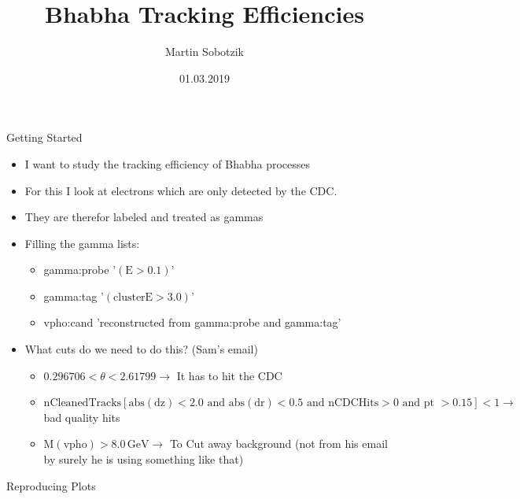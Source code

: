 \documentclass[10pt]{beamer}
\title{Bhabha Tracking Efficiencies}
\date{01.03.2019}
\author{Martin Sobotzik}
\institute{Johannes Gutenberg Universit\"at Mainz}
\begin{document}
\maketitle
{%



\begin{frame}{Getting Started}

\begin{itemize}	
	\item I want to study the tracking efficiency of Bhabha processes
	\item For this I look at electrons which are only detected by the CDC.
	\item They are therefor labeled and treated as gammas
	
	\item Filling the gamma lists:
	
	\begin{itemize}
		\item gamma:probe '$(\textrm{E} > 0.1 )$'
		\item gamma:tag '$(\textrm{clusterE} > 3.0)$'
		\item vpho:cand 'reconstructed from gamma:probe and gamma:tag'
	\end{itemize}

	\item What cuts do we need to do this? (Sam's email)
		\begin{itemize}
			\item $0.296706 < \theta < 2.61799 \rightarrow$ It has to hit the CDC
			\item $\textrm{nCleanedTracks}[ \textrm{abs}(\textrm{dz}) < 2.0 \textrm{ and } \textrm{abs}(\textrm{dr}) < 0.5 \textrm{ and nCDCHits} > 0 \textrm{ and pt } > 0.15] < 1 \rightarrow $ bad quality hits 
			\item $\textrm{M}(\textrm{vpho}) > 8.0\,\textrm{GeV} \rightarrow $ To Cut away background (not from his email by surely he is using something like that)					
		\end{itemize}
	
\end{itemize}	
\end{frame}

\begin{frame}{Reproducing Plots}
	

\end{frame}}
\end{document}
